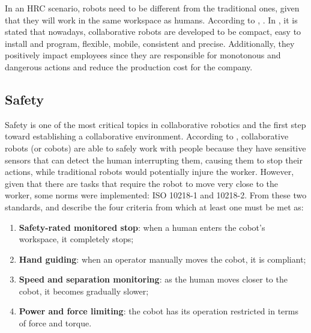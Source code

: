 \documentclass[conference]{IEEEtran}
\begin{document}
In an HRC scenario, robots need to be different from the traditional ones, given that they will work in the same workspace as humans. According to \textcite{Castro2021}, . In \cite{CobotsWW}, it is stated that nowadays, collaborative robots are developed to be compact, easy to install and program, flexible, mobile, consistent and precise. Additionally, they positively impact employees since they are responsible for monotonous and dangerous actions and reduce the production cost for the company.

\subsection{Safety}

Safety is one of the most critical topics in collaborative robotics and the first step toward establishing a collaborative environment. According to \cite{CobotsWW}, collaborative robots (or cobots) are able to safely work with people because they have sensitive sensors that can detect the human interrupting them, causing them to stop their actions, while traditional robots would potentially injure the worker. However, given that there are tasks that require the robot to move very close to the worker, some norms were implemented: ISO 10218-1 and 10218-2. From these two standards, \textcite{Castro2021} and \textcite{Villani2018} describe the four criteria from which at least one must be met as:

\begin{enumerate}
  \item \textbf{Safety-rated monitored stop}: when a human enters the cobot’s workspace, it completely stops;
  \item \textbf{Hand guiding}: when an operator manually moves the cobot, it is compliant;
  \item \textbf{Speed and separation monitoring}: as the human moves closer to the cobot, it becomes gradually slower;
  \item \textbf{Power and force limiting}: the cobot has its operation restricted in terms of force and torque.
\end{enumerate}
\end{document}
